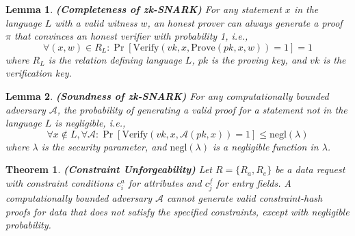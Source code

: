 \documentclass[journal]{IEEEtran}
\newtheorem{theorem}{Theorem}
\newtheorem{lemma}{Lemma}
\begin{document}
\begin{lemma} \label{lemma:completeness}
    \textbf{(Completeness of zk-SNARK)} 
    For any statement $x$ in the language $L$ with a valid witness $w$, an honest prover can always generate a proof $\pi$ that convinces an honest verifier with probability 1, i.e.,
    \begin{equation}
        \forall (x, w) \in R_L: \Pr[\text{Verify}(vk, x, \text{Prove}(pk, x, w)) = 1] = 1
    \end{equation}
    where $R_L$ is the relation defining language $L$, $pk$ is the proving key, and $vk$ is the verification key.
\end{lemma}

\begin{lemma} \label{lemma:soundness}
    \textbf{(Soundness of zk-SNARK)} 
    For any computationally bounded adversary $\mathcal{A}$, the probability of generating a valid proof for a statement not in the language $L$ is negligible, i.e.,
    \begin{equation}
        \forall x \notin L, \forall \mathcal{A}: \Pr[\text{Verify}(vk, x, \mathcal{A}(pk, x)) = 1] \leq \text{negl}(\lambda)
    \end{equation}
    where $\lambda$ is the security parameter, and $\text{negl}(\lambda)$ is a negligible function in $\lambda$.
\end{lemma}
\begin{theorem}
    \textbf{(Constraint Unforgeability)} 
     Let $R=\{R_a,R_e\}$ be a data request with constraint conditions $c_i^a$ for attributes and $c_j^f$ for entry fields. A computationally bounded adversary $\mathcal{A}$ cannot generate valid constraint-hash proofs for data that does not satisfy the specified constraints, except with negligible probability.
\end{theorem}
\end{document}
